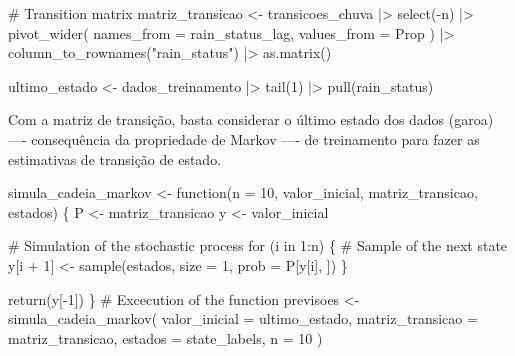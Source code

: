 \documentclass[
  letterpaper,
  DIV=11,
  numbers=noendperiod]{scrreprt}
\newenvironment{Shaded}{\begin{snugshade}}{\end{snugshade}}
\newcommand{\AttributeTok}[1]{\textcolor[rgb]{0.40,0.45,0.13}{#1}}
\newcommand{\CommentTok}[1]{\textcolor[rgb]{0.37,0.37,0.37}{#1}}
\newcommand{\ControlFlowTok}[1]{\textcolor[rgb]{0.00,0.23,0.31}{#1}}
\newcommand{\DecValTok}[1]{\textcolor[rgb]{0.68,0.00,0.00}{#1}}
\newcommand{\FunctionTok}[1]{\textcolor[rgb]{0.28,0.35,0.67}{#1}}
\newcommand{\NormalTok}[1]{\textcolor[rgb]{0.00,0.23,0.31}{#1}}
\newcommand{\OtherTok}[1]{\textcolor[rgb]{0.00,0.23,0.31}{#1}}
\newcommand{\SpecialCharTok}[1]{\textcolor[rgb]{0.37,0.37,0.37}{#1}}
\newcommand{\StringTok}[1]{\textcolor[rgb]{0.13,0.47,0.30}{#1}}
\begin{document}
\begin{Shaded}
\begin{Highlighting}[]
\CommentTok{\# Transition matrix}
\NormalTok{matriz\_transicao }\OtherTok{\textless{}{-}}
\NormalTok{    transicoes\_chuva }\SpecialCharTok{|\textgreater{}}
    \FunctionTok{select}\NormalTok{(}\SpecialCharTok{{-}}\NormalTok{n) }\SpecialCharTok{|\textgreater{}}
    \FunctionTok{pivot\_wider}\NormalTok{(}
        \AttributeTok{names\_from =}\NormalTok{ rain\_status\_lag,}
        \AttributeTok{values\_from =}\NormalTok{ Prop}
\NormalTok{    ) }\SpecialCharTok{|\textgreater{}}
    \FunctionTok{column\_to\_rownames}\NormalTok{(}\StringTok{"rain\_status"}\NormalTok{) }\SpecialCharTok{|\textgreater{}}
    \FunctionTok{as.matrix}\NormalTok{()}

\NormalTok{ultimo\_estado }\OtherTok{\textless{}{-}}\NormalTok{ dados\_treinamento }\SpecialCharTok{|\textgreater{}}
    \FunctionTok{tail}\NormalTok{(}\DecValTok{1}\NormalTok{) }\SpecialCharTok{|\textgreater{}}
    \FunctionTok{pull}\NormalTok{(rain\_status)}
\end{Highlighting}
\end{Shaded}

Com a matriz de transição, basta considerar o último estado dos dados
(garoa) ---- consequência da propriedade de Markov ---- de treinamento
para fazer as estimativas de transição de estado.

\begin{Shaded}
\begin{Highlighting}[]
\NormalTok{simula\_cadeia\_markov }\OtherTok{\textless{}{-}} \ControlFlowTok{function}\NormalTok{(}\AttributeTok{n =} \DecValTok{10}\NormalTok{,}
\NormalTok{                                 valor\_inicial,}
\NormalTok{                                 matriz\_transicao,}
\NormalTok{                                 estados) \{}
\NormalTok{    P }\OtherTok{\textless{}{-}}\NormalTok{ matriz\_transicao}
\NormalTok{    y }\OtherTok{\textless{}{-}}\NormalTok{ valor\_inicial}

    \CommentTok{\# Simulation of the stochastic process}
    \ControlFlowTok{for}\NormalTok{ (i }\ControlFlowTok{in} \DecValTok{1}\SpecialCharTok{:}\NormalTok{n) \{}
        \CommentTok{\# Sample of the next state}
\NormalTok{        y[i }\SpecialCharTok{+} \DecValTok{1}\NormalTok{] }\OtherTok{\textless{}{-}} \FunctionTok{sample}\NormalTok{(estados, }\AttributeTok{size =} \DecValTok{1}\NormalTok{, }\AttributeTok{prob =}\NormalTok{ P[y[i], ])}
\NormalTok{    \}}

    \FunctionTok{return}\NormalTok{(y[}\SpecialCharTok{{-}}\DecValTok{1}\NormalTok{])}
\NormalTok{\}}
\CommentTok{\# Excecution of the function}
\NormalTok{previsoes }\OtherTok{\textless{}{-}} \FunctionTok{simula\_cadeia\_markov}\NormalTok{(}
    \AttributeTok{valor\_inicial =}\NormalTok{ ultimo\_estado,}
    \AttributeTok{matriz\_transicao =}\NormalTok{ matriz\_transicao,}
    \AttributeTok{estados =}\NormalTok{ state\_labels,}
    \AttributeTok{n =} \DecValTok{10}
\NormalTok{)}
\end{Highlighting}
\end{Shaded}
\end{document}
